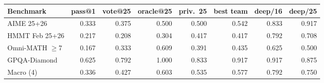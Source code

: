 \begin{tabular}{lrrrrrrr}
\toprule
Benchmark & pass@1 & vote@25 & oracle@25 & priv.\ 25 & best team & deep/16 & deep/25 \\
\midrule
AIME 25+26 & 0.333 & 0.375 & 0.500 & 0.500 & 0.542 & 0.833 & 0.917 \\
HMMT Feb 25+26 & 0.217 & 0.208 & 0.304 & 0.417 & 0.417 & 0.792 & 0.708 \\
Omni-MATH $\geq$7 & 0.167 & 0.333 & 0.609 & 0.391 & 0.435 & 0.625 & 0.500 \\
GPQA-Diamond & 0.625 & 0.792 & 1.000 & 0.833 & 0.917 & 0.917 & 0.875 \\
Macro (4) & 0.336 & 0.427 & 0.603 & 0.535 & 0.577 & 0.792 & 0.750 \\
\bottomrule
\end{tabular}
